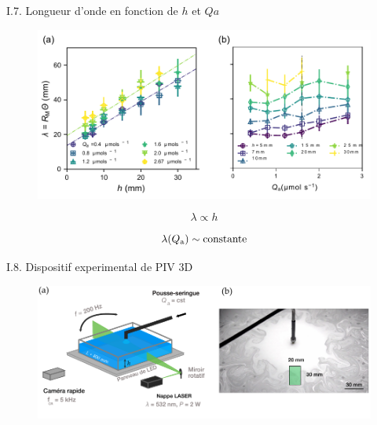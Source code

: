 \documentclass[aspectratio=169,10pt]{beamer}
\begin{document}
\begin{frame}{I.7. Longueur d'onde en fonction de $h$ et $Qa$}
    \begin{figure}[t]
        \centering
        \includegraphics[width=.85\textwidth]{./figures/Lambda_measurement_1.pdf}
    \end{figure}
    \vspace{-.8cm}
    
    \hspace{1cm}\begin{minipage}{6cm}
        \begin{ombretheo}
            \begin{theo}
                \[\lambda \propto h\]
            \end{theo}
        \end{ombretheo}
    \end{minipage}
    \hspace{.4cm}\begin{minipage}{6cm}
        \begin{ombretheo}
            \begin{theo}
                \[\lambda(Q_{\rm a}) \sim \rm constante\]
            \end{theo}
        \end{ombretheo}
    \end{minipage}
\end{frame}

\begin{frame}{I.8. Dispositif experimental de PIV 3D}
    \begin{figure}
        \centering
        \includegraphics[width=1\textwidth]{./figures/DispositifPIV_v2.pdf}
    \end{figure}
    
\end{frame}
\end{document}
